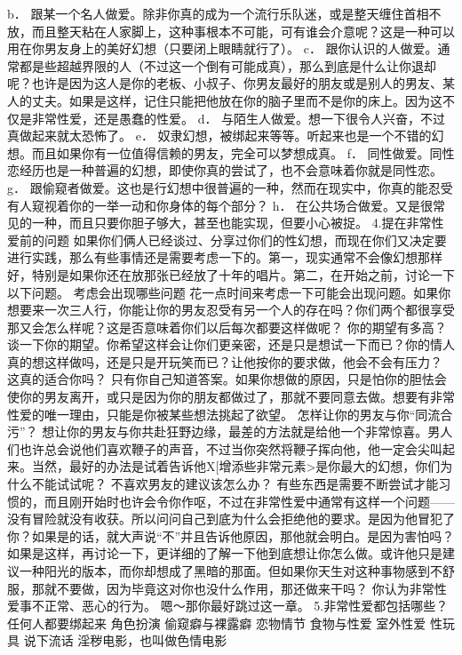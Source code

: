 \documentclass[12pt,UTF8,openany]{ctexbook}
\begin{document}
b． 跟某一个名人做爱。除非你真的成为一个流行乐队迷，或是整天缠住首相不放，而且整天粘在人家脚上，这种事根本不可能，可有谁会介意呢？这是一种可以用在你男友身上的美好幻想（只要闭上眼睛就行了）。
c． 跟你认识的人做爱。通常都是些超越界限的人（不过这一个倒有可能成真），那么到底是什么让你退却呢？也许是因为这人是你的老板、小叔子、你男友最好的朋友或是别人的男友、某人的丈夫。如果是这样，记住只能把他放在你的脑子里而不是你的床上。因为这不仅是非常性爱，还是愚蠢的性爱。
d． 与陌生人做爱。想一下很令人兴奋，不过真做起来就太恐怖了。
e． 奴隶幻想，被绑起来等等。听起来也是一个不错的幻想。而且如果你有一位值得信赖的男友，完全可以梦想成真。
f． 同性做爱。同性恋经历也是一种普遍的幻想，即使你真的尝试了，也不会意味着你就是同性恋。
g． 跟偷窥者做爱。这也是行幻想中很普遍的一种，然而在现实中，你真的能忍受有人窥视着你的一举一动和你身体的每个部分？
h． 在公共场合做爱。又是很常见的一种，而且只要你胆子够大，甚至也能实现，但要小心被捉。
4.提在非常性爱前的问题
如果你们俩人已经谈过、分享过你们的性幻想，而现在你们又决定要进行实践，那么有些事情还是需要考虑一下的。第一，现实通常不会像幻想那样好，特别是如果你还在放那张已经放了十年的唱片。第二，在开始之前，讨论一下以下问题。
考虑会出现哪些问题
花一点时间来考虑一下可能会出现问题。如果你想要来一次三人行，你能让你的男友忍受有另一个人的存在吗？你们两个都很享受那又会怎么样呢？这是否意味着你们以后每次都要这样做呢？
你的期望有多高？
谈一下你的期望。你希望这样会让你们更亲密，还是只是想试一下而已？你的情人真的想这样做吗，还是只是开玩笑而已？让他按你的要求做，他会不会有压力？
这真的适合你吗？
只有你自己知道答案。如果你想做的原因，只是怕你的胆怯会使你的男友离开，或只是因为你的朋友都做过了，那就不要同意去做。想要有非常性爱的唯一理由，只能是你被某些想法挑起了欲望。
怎样让你的男友与你“同流合污”？
想让你的男友与你共赴狂野边缘，最差的方法就是给他一个非常惊喜。男人们也许总会说他们喜欢鞭子的声音，不过当你突然将鞭子挥向他，他一定会尖叫起来。当然，最好的办法是试着告诉他X[增添些非常元素>是你最大的幻想，你们为什么不能试试呢？
不喜欢男友的建议该怎么办？
有些东西是需要不断尝试才能习惯的，而且刚开始时也许会令你作呕，不过在非常性爱中通常有这样一个问题——没有冒险就没有收获。所以问问自己到底为什么会拒绝他的要求。是因为他冒犯了你？如果是的话，就大声说“不”并且告诉他原因，那他就会明白。是因为害怕吗？如果是这样，再讨论一下，更详细的了解一下他到底想让你怎么做。或许他只是建议一种阳光的版本，而你却想成了黑暗的那面。但如果你天生对这种事物感到不舒服，那就不要做，因为毕竟这对你也没什么作用，那还做来干吗？
你认为非常性爱事不正常、恶心的行为。
嗯～那你最好跳过这一章。
5.非常性爱都包括哪些？
任何人都要绑起来
角色扮演
偷窥癖与裸露癖
恋物情节
食物与性爱
室外性爱
性玩具
说下流话
淫秽电影，也叫做色情电影
\end{document}
